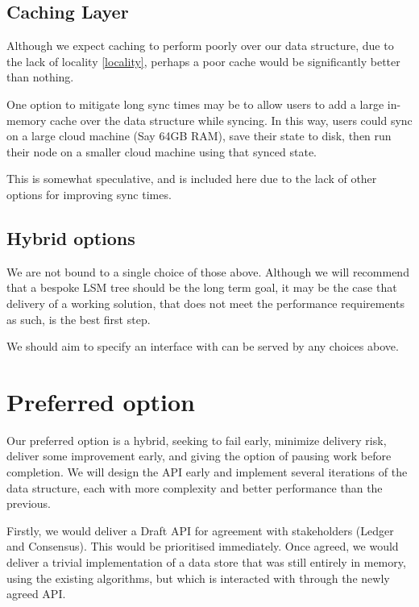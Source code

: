 \documentclass[11pt,a4paper]{article}
\begin{document}
\subsection{Caching Layer}
\label{Caching Layer}

Although we expect caching to perform poorly over our data structure, due to the
lack of locality \ref{locality}, perhaps a poor cache would be significantly
better than nothing.

One option to mitigate long sync times may be to allow users to add a large
in-memory cache over the data structure while syncing. In this way, users could
sync on a large cloud machine (Say 64GB RAM), save their state to disk, then run
their node on a smaller cloud machine using that synced state.

This is somewhat speculative, and is included here due to the lack of other
options for improving sync times.

\subsection{Hybrid options}

We are not bound to a single choice of those above. Although we will recommend that
a bespoke LSM tree should be the long term goal, it may be the case that delivery of a
working solution, that does not meet the performance requirements as such, is
the best first step.

We should aim to specify an interface with can be served by any choices above.

\section{Preferred option}
\label{preferred}

Our preferred option is a hybrid, seeking to fail early, minimize delivery risk,
deliver some improvement early, and giving the option of pausing work before
completion. We will design the API early and implement several iterations of the
data structure, each with more complexity and better performance than the
previous.

Firstly, we would deliver a Draft API for agreement with stakeholders (Ledger
and Consensus). This would be prioritised immediately. Once agreed, we would
deliver a trivial implementation of a data store that was still entirely in
memory, using the existing algorithms, but which is interacted with through the
newly agreed API.
\end{document}
